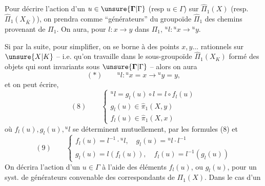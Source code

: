 Pour décrire l'action d'un $u\in\unsure{\mathbf{\Gamma}|\Gamma}$ (resp $u\in\Gamma$) sur $\widehat\Pi_1(X)$ (resp. $\widehat\Pi_1(X_{\bar K})$), on prendra comme ``générateurs'' du groupoïde $\widehat\Pi_1$ des chemins provenant de $\Pi_1$. On aura, pour ${l}:x\to y$ dans $\Pi_1$, ${}^u{l}:{}^ux\to{}^uy$.

Si  par la suite, pour simplifier, on se borne à des points $x,y\ldots$ rationnels sur $\unsure{X|K}$ -- i.e. qu'on travaille dans le sous-groupoïde $\widehat\Pi_1(X_K)$ formé des objets qui sont invariants sous $\unsure{\mathbf{\Gamma}|\Gamma}$ -- alors on aura
\[
(*)\qquad{}^u{l}:{}^ux=x\longrightarrow{}^uy=y,
\]
et on peut écrire, 
\[
(8)\qquad\begin{cases}
{}^u{l}=g_{l}(u)\circ{l}={l}\circ f_{l}(u)\\
g_{l}(u)\in\widehat\pi_1(X,y)\\
f_{l}(u)\in\widehat\pi_1(X,x)
\end{cases}
\]
où $f_{l}(u),g_{l}(u),{}^u{l}$ se déterminent mutuellement,  par les formules (8) et
\[
(9)\qquad\begin{cases}
f_{l}(u)={l}^{-1}\cdot{}^u{l},\quad g_{l}(u)={}^u{l}\cdot{l}^{-1}\\
g_{l}(u)={l}(f_{l}(u)),\quad f_{l}(u)={l}^{-1}(g_{l}(u))
\end{cases}
\]
On décrira l'action d'un $u\in\Gamma$  à l'aide des éléments $f_{l}(u)$, ou $g_{l}(u)$, pour un syst. de générateurs convenable des  correspondants de $\Pi_1(X)$. Dans le cas d'un
